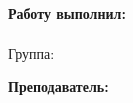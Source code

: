\begin{titlepage}
  \begin{center}
    \large \university \\

    \vfill

    \large \faculty \\
    \large \department \\[6cm]

    \huge \docname \\[0.5cm]
    \large \subject \\[5.1cm]
  \end{center}

  \begin{flushright}
    \begin{minipage}{0.25\textwidth}
      \begin{flushleft}
        \large\textbf{Работу выполнил:}\\
        \large \student \\
        \large {Группа:} \group \\

        \vfill

        \large \textbf{Преподаватель:}\\
        \large \tutor
      \end{flushleft}
    \end{minipage}
  \end{flushright}

  \vfill

  \begin{center}
    \large \city \\
    \large \the\year
  \end{center}
\end{titlepage}
